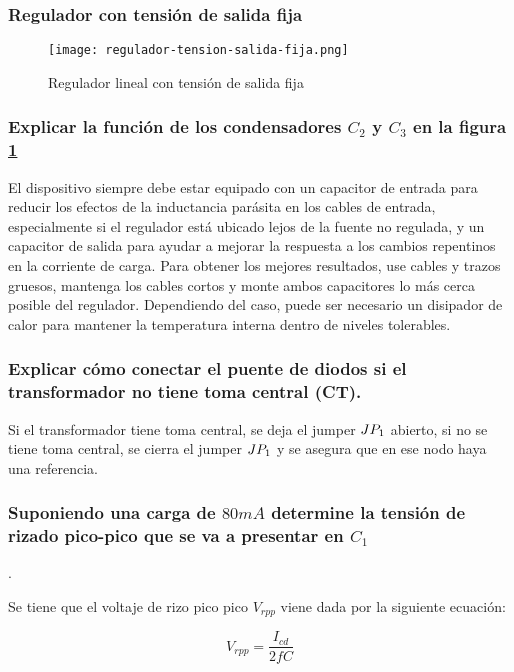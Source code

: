 \subsubsection{Regulador con tensión de salida fija}

\begin{figure}[ht]
    \centering
    \texttt{[image: regulador-tension-salida-fija.png]}
    \caption{Regulador lineal con tensión de salida fija}
    \label{fig:regulador-lineal-tension-fija}
\end{figure}

\subsubsection*{Explicar la función de los condensadores $C_2$ y $C_3$ en la figura \ref{fig:regulador-lineal-tension-fija}}

El dispositivo siempre debe estar equipado con un capacitor de entrada para reducir los efectos de la inductancia parásita en los cables de entrada, especialmente si el regulador está ubicado lejos de la fuente no regulada, y un capacitor de salida para ayudar a mejorar la respuesta a los cambios repentinos en la corriente de carga. Para obtener los mejores resultados, use cables y trazos gruesos, mantenga los cables cortos y monte ambos capacitores lo más cerca posible del regulador. Dependiendo del caso, puede ser necesario un disipador de calor para mantener la temperatura interna dentro de niveles tolerables.

\subsubsection*{Explicar cómo conectar el puente de diodos si el transformador no tiene toma central (CT).}

Si el transformador tiene toma central, se deja el jumper $JP_{1}$ abierto, si no se tiene toma central, se cierra el jumper $JP_{1}$ y se asegura que en ese nodo haya una referencia.

\subsubsection*{Suponiendo una carga de $80mA$ determine la tensión de rizado pico-pico que se va a presentar en $C_1$}.

Se tiene que el voltaje de rizo pico pico $V_{rpp}$ viene dada por la siguiente ecuación:

\begin{equation}
    V_{rpp} = \frac{I_{cd}}{2 f C}
\end{equation}

